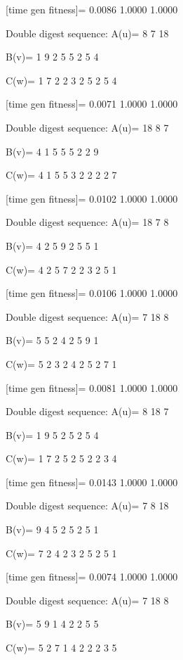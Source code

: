 [time gen fitness]=
    0.0086    1.0000    1.0000

Double digest sequence:
A(u)=
     8     7    18

B(v)=
     1     9     2     5     5     2     5     4

C(w)=
     1     7     2     2     3     2     5     2     5     4

[time gen fitness]=
    0.0071    1.0000    1.0000

Double digest sequence:
A(u)=
    18     8     7

B(v)=
     4     1     5     5     5     2     2     9

C(w)=
     4     1     5     5     3     2     2     2     2     7

[time gen fitness]=
    0.0102    1.0000    1.0000

Double digest sequence:
A(u)=
    18     7     8

B(v)=
     4     2     5     9     2     5     5     1

C(w)=
     4     2     5     7     2     2     3     2     5     1

[time gen fitness]=
    0.0106    1.0000    1.0000

Double digest sequence:
A(u)=
     7    18     8

B(v)=
     5     5     2     4     2     5     9     1

C(w)=
     5     2     3     2     4     2     5     2     7     1

[time gen fitness]=
    0.0081    1.0000    1.0000

Double digest sequence:
A(u)=
     8    18     7

B(v)=
     1     9     5     2     5     2     5     4

C(w)=
     1     7     2     5     2     5     2     2     3     4

[time gen fitness]=
    0.0143    1.0000    1.0000

Double digest sequence:
A(u)=
     7     8    18

B(v)=
     9     4     5     2     5     2     5     1

C(w)=
     7     2     4     2     3     2     5     2     5     1

[time gen fitness]=
    0.0074    1.0000    1.0000

Double digest sequence:
A(u)=
     7    18     8

B(v)=
     5     9     1     4     2     2     5     5

C(w)=
     5     2     7     1     4     2     2     2     3     5

